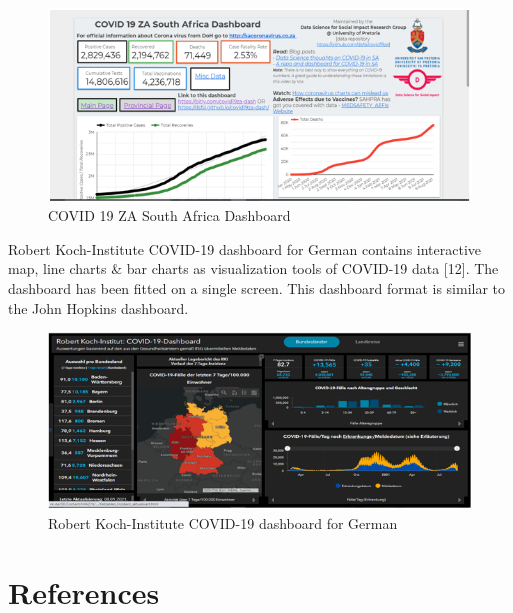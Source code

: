 \documentclass[
]{article}
\begin{document}
\begin{figure}
\includegraphics[width=8.46in]{Images/14} \caption{COVID 19 ZA South Africa Dashboard}\label{fig:unnamed-chunk-14}
\end{figure}

Robert Koch-Institute COVID-19 dashboard for German contains interactive
map, line charts \& bar charts as visualization tools of COVID-19 data
{[}12{]}. The dashboard has been fitted on a single screen. This
dashboard format is similar to the John Hopkins dashboard.

\begin{figure}
\includegraphics[width=8.33in]{Images/15} \caption{Robert Koch-Institute COVID-19 dashboard for German}\label{fig:unnamed-chunk-15}
\end{figure}

\hypertarget{references}{%
\section*{References}\label{references}}
\end{document}
